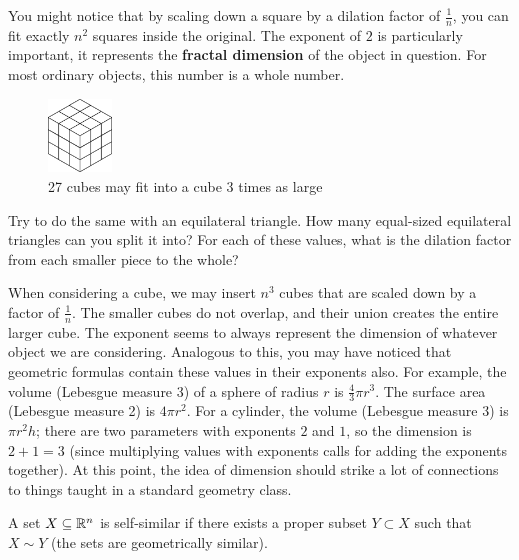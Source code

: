 You might notice that by scaling down a square by a dilation factor of $\frac{1}{n}$, you can fit exactly $n^2$ squares inside the original. The exponent of $2$ is particularly important, it represents the \textbf{fractal dimension} of the object in question. For most ordinary objects, this number is a whole number. \par

\begin{figure}
  \begin{center}
    \includegraphics[width=0.15\textwidth]{Images/1.4.2.png}
  \end{center}
  \caption{27 cubes may fit into a cube 3 times as large}
\end{figure}

\begin{exercise}
    Try to do the same with an equilateral triangle. How many equal-sized equilateral triangles can you split it into? For each of these values, what is the dilation factor from each smaller piece to the whole? 
\end{exercise}



When considering a cube, we may insert $n^3$ cubes that are scaled down by a factor of $\frac{1}{n}$. The smaller cubes do not overlap, and their union creates the entire larger cube. The exponent seems to always represent the dimension of whatever object we are considering. Analogous to this, you may have noticed that geometric formulas contain these values in their exponents also. For example, the volume (Lebesgue measure 3) of a sphere of radius $r$ is $\frac{4}{3}\pi r^3$. The surface area (Lebesgue measure 2) is $4\pi r^2$. For a cylinder, the volume (Lebesgue measure 3) is $\pi r^2 h$; there are two parameters with exponents $2$ and $1$, so the dimension is $2+1=3$ (since multiplying values with exponents calls for adding the exponents together). At this point, the idea of dimension should strike a lot of connections to things taught in a standard geometry class. 

\clearpage

\begin{definition}
    A set $X\subseteq \mathbb{R}^n$ is self-similar if there exists a proper subset $Y\subset X$ such that $X \sim Y$ (the sets are geometrically similar).
\end{definition}

